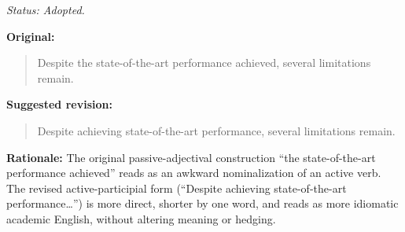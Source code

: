 \documentclass{article}
\begin{document}
\textit{Status: Adopted.}

\textbf{Original:}
\begin{quote}
Despite the state-of-the-art performance achieved, several limitations remain.
\end{quote}

\textbf{Suggested revision:}
\begin{quote}
Despite achieving state-of-the-art performance, several limitations remain.
\end{quote}

\textbf{Rationale:}
The original passive-adjectival construction ``the state-of-the-art performance achieved'' reads as an awkward nominalization of an active verb. The revised active-participial form (``Despite achieving state-of-the-art performance\ldots'') is more direct, shorter by one word, and reads as more idiomatic academic English, without altering meaning or hedging.
\end{document}
